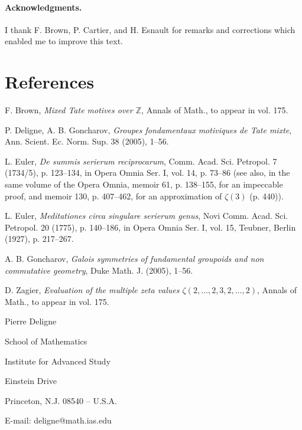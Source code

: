 \documentclass[11pt]{article}
\newcommand{\Z}{\mathbb Z}
\begin{document}
\paragraph{Acknowledgments.}
I thank F. Brown, P. Cartier, and H. Esnault for remarks and corrections which enabled me to improve this text.

\section*{References}

\begin{enumerate}[label={[\arabic*]}, leftmargin=2.4em]
\item F. Brown, \textit{Mixed Tate motives over $\Z$}, Annals of Math., to appear in vol. 175.
\item P. Deligne, A. B. Goncharov, \textit{Groupes fondamentaux motiviques de Tate mixte}, Ann. Scient. Ec. Norm. Sup. 38 (2005), 1--56.
\item L. Euler, \textit{De summis serierum reciprocarum}, Comm. Acad. Sci. Petropol. 7 (1734/5), p. 123--134, in Opera Omnia Ser. I, vol. 14, p. 73--86 (see also, in the same volume of the Opera Omnia, memoir 61, p. 138--155, for an impeccable proof, and memoir 130, p. 407--462, for an approximation of $\zeta(3)$ (p. 440)).
\item L. Euler, \textit{Meditationes circa singulare serierum genus}, Novi Comm. Acad. Sci. Petropol. 20 (1775), p. 140--186, in Opera Omnia Ser. I, vol. 15, Teubner, Berlin (1927), p. 217--267.
\item A. B. Goncharov, \textit{Galois symmetries of fundamental groupoids and non commutative geometry}, Duke Math. J. (2005), 1--56.
\item D. Zagier, \textit{Evaluation of the multiple zeta values $\zeta(2,\ldots,2,3,2,\ldots,2)$}, Annals of Math., to appear in vol. 175.
\end{enumerate}

\vspace{1em}
\noindent Pierre Deligne\par
\noindent School of Mathematics\par
\noindent Institute for Advanced Study\par
\noindent Einstein Drive\par
\noindent Princeton, N.J. 08540 -- U.S.A.\par
\noindent E-mail: deligne@math.ias.edu
\end{document}
